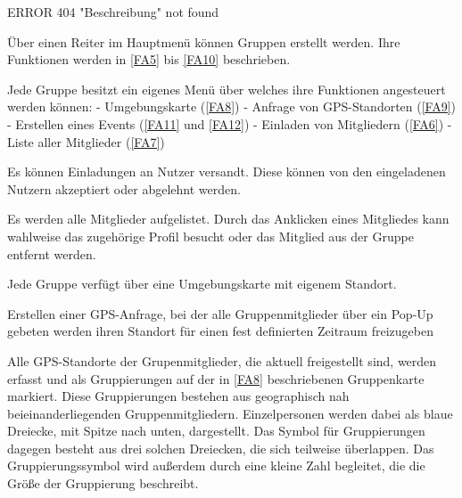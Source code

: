 \documentclass[parskip=full,11pt,twoside]{scrartcl}
\begin{document}
\label{FA3}
ERROR 404 "Beschreibung" not found

\label{FA4}
Über einen Reiter im Hauptmenü können Gruppen erstellt werden. Ihre Funktionen werden in \ref{FA5} bis \ref{FA10} beschrieben.

\label{FA5}
Jede Gruppe besitzt ein eigenes Menü über welches ihre Funktionen angesteuert werden können:
- Umgebungskarte (\ref{FA8})
- Anfrage von GPS-Standorten (\ref{FA9})
- Erstellen eines Events (\ref{FA11} und \ref{FA12})
- Einladen von Mitgliedern (\ref{FA6})
- Liste aller Mitglieder (\ref{FA7})

\label{FA6}
Es können Einladungen an Nutzer versandt. Diese können von den eingeladenen Nutzern akzeptiert oder abgelehnt werden.

\label{FA7}
Es werden alle Mitglieder aufgelistet. Durch das Anklicken eines Mitgliedes kann wahlweise das zugehörige Profil besucht oder das Mitglied aus der Gruppe entfernt werden.

\label{FA8}
Jede Gruppe verfügt über eine Umgebungskarte mit eigenem Standort.

\label{FA9}
Erstellen einer GPS-Anfrage, bei der alle Gruppenmitglieder über ein Pop-Up gebeten werden ihren Standort für einen fest definierten Zeitraum freizugeben

\label{FA10}
Alle GPS-Standorte der Grupenmitglieder, die aktuell freigestellt sind, werden erfasst und als Gruppierungen auf der in \ref{FA8} beschriebenen Gruppenkarte markiert. Diese Gruppierungen bestehen aus geographisch nah beieinanderliegenden Gruppenmitgliedern. Einzelpersonen werden dabei als blaue Dreiecke, mit Spitze nach unten, dargestellt. Das Symbol für Gruppierungen dagegen besteht aus drei solchen Dreiecken, die sich teilweise überlappen. Das Gruppierungssymbol wird außerdem durch eine kleine Zahl begleitet, die die Größe der Gruppierung beschreibt.
\end{document}
